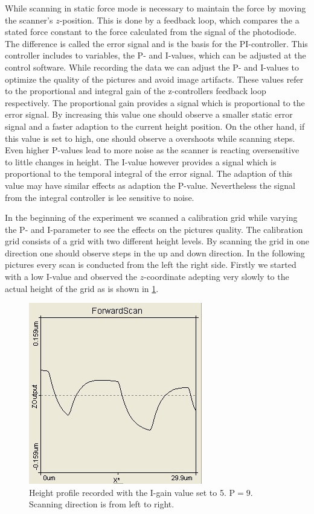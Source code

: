 \documentclass[paper=a4,fontsize=10pt,DIV=18,twocolumn,parskip=half]{scrartcl}
\numberwithin{equation}{section}    %
\begin{document}
While scanning in static force mode is necessary to maintain the force by moving 
the scanner's $z$-position. This is done by a feedback loop, which compares the 
a stated force constant to the force calculated from the signal of the 
photodiode. The difference is called the error signal and is the basis for the 
PI-controller. This controller includes to variables, the P- and I-values, which 
can be adjusted at the control software.
While recording the data we can adjust the P- and I-values to optimize the 
quality of the pictures and avoid image artifacts. These values refer to the 
proportional and integral gain of the z-controllers feedback loop respectively. 
The proportional gain provides a signal which is proportional to the error 
signal. By increasing this value one should observe a smaller static error 
signal and a faster adaption to the current height position.
On the other hand, if this value is set to high, one should observe a overshoots 
while scanning steps. Even higher P-values lead to more noise as the scanner is 
reacting oversensitive to little changes in height. The I-value however provides 
a signal which is proportional to the temporal integral of the error signal. The 
adaption of this value may have similar effects as adaption the P-value. 
Nevertheless the signal from the integral controller is lee sensitive to noise.

In the beginning of the experiment we scanned a calibration grid while varying 
the P- and I-parameter to see the effects on the pictures quality. The 
calibration grid consists of a grid with two different height levels. By 
scanning the grid in one direction one should observe steps in the up and down 
direction. In the following pictures every scan is conducted from the left the 
right side. Firstly we started with a low I-value and observed the 
$z$-coordinate adepting very slowly to the actual height of the grid as is shown 
in \ref{wenigI}.

\begin{figure}[htp]
    \begin{center}
        \includegraphics[width=0.6\columnwidth]{Bilder/wenigI}
        \caption{Height profile recorded with the I-gain value set to 5. 
        $\mathrm{P}=9$. Scanning direction is from left to right.}
        \label{wenigI}
    \end{center}
\end{figure}
\end{document}
